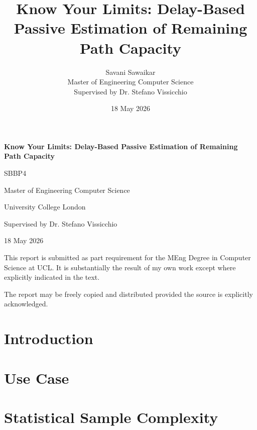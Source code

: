 \documentclass[a4paper,11pt]{report}
\title{Know Your Limits: Delay-Based Passive Estimation of Remaining Path Capacity}
\date{18 May 2026}
\author{Savani Sawaikar\\
Master of Engineering Computer Science\\
Supervised by Dr. Stefano Vissicchio}
\begin{document}
\onehalfspacing
{}

\begin{titlepage}
\centering
\vspace*{2cm}
{\Large\bfseries Know Your Limits: Delay-Based Passive Estimation of Remaining Path Capacity\par}
\vspace{1.5cm}
{\large SBBP4\par}
\vspace{0.5cm}
{Master of Engineering Computer Science\par}
{University College London\par}
\vspace{0.5cm}
{Supervised by Dr. Stefano Vissicchio\par}
\vspace{0.5cm}
{18 May 2026\par}
\vfill
\begin{minipage}{0.9\textwidth}
\small
This report is submitted as part requirement for the MEng Degree in Computer Science at UCL. It is substantially the result of my own work except where explicitly indicated in the text.

The report may be freely copied and distributed provided the source is explicitly acknowledged.
\end{minipage}
\end{titlepage}

\begin{abstract}


\end{abstract}

\clearpage
{}
\setcounter{page}{1}
\tableofcontents

\chapter{Introduction}



\chapter{Use Case}



\chapter{Statistical Sample Complexity}
\label{sec:eval-statistical}
\end{document}
